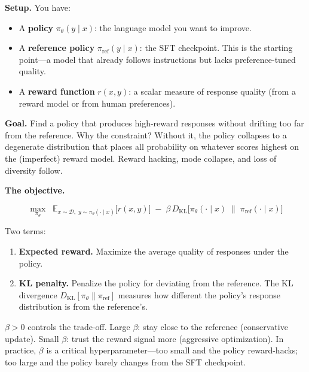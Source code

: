 \begin{tcolorbox}[colback=blue!5, colframe=blue!40, title=\textbf{The Core Objective: Reward Maximization with Drift Control}]
\textbf{Setup.} You have:
\begin{itemize}[nosep]
  \item A \textbf{policy} $\pi_\theta(y \mid x)$: the language model you want to improve.
  \item A \textbf{reference policy} $\pi_{\text{ref}}(y \mid x)$: the SFT checkpoint. This is the starting point---a model that already follows instructions but lacks preference-tuned quality.
  \item A \textbf{reward function} $r(x, y)$: a scalar measure of response quality (from a reward model or from human preferences).
\end{itemize}

\textbf{Goal.} Find a policy that produces high-reward responses without drifting too far from the reference. Why the constraint? Without it, the policy collapses to a degenerate distribution that places all probability on whatever scores highest on the (imperfect) reward model. Reward hacking, mode collapse, and loss of diversity follow.

\textbf{The objective.}

\begin{equation}
\label{eq:kl-objective}
\max_{\pi_\theta} \;\; \mathbb{E}_{x \sim \mathcal{D},\; y \sim \pi_\theta(\cdot \mid x)} \bigl[r(x, y)\bigr] \;-\; \beta \, D_{\text{KL}}\!\bigl[\pi_\theta(\cdot \mid x) \;\|\; \pi_{\text{ref}}(\cdot \mid x)\bigr]
\end{equation}

Two terms:
\begin{enumerate}[nosep]
  \item \textbf{Expected reward.} Maximize the average quality of responses under the policy.
  \item \textbf{KL penalty.} Penalize the policy for deviating from the reference. The KL divergence $D_{\text{KL}}[\pi_\theta \| \pi_{\text{ref}}]$ measures how different the policy's response distribution is from the reference's.
\end{enumerate}

$\beta > 0$ controls the trade-off. Large $\beta$: stay close to the reference (conservative update). Small $\beta$: trust the reward signal more (aggressive optimization). In practice, $\beta$ is a critical hyperparameter---too small and the policy reward-hacks; too large and the policy barely changes from the SFT checkpoint.
\end{tcolorbox}

